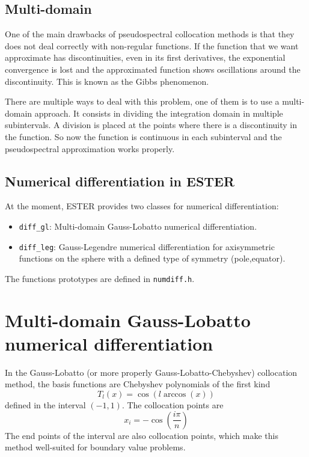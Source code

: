 \subsection{Multi-domain}

One of the main drawbacks of pseudospectral collocation methods is that they does not deal correctly
with non-regular functions. If the function that we want approximate has discontinuities, even in its
first derivatives, the exponential convergence is lost and the approximated function shows oscillations
around the discontinuity. This is known as the Gibbs phenomenon. 

There are multiple ways to deal with this problem, one of them is to use a multi-domain approach. 
It consists in dividing the integration domain in multiple subintervals. A division is placed at
the points where there is a discontinuity in the function. So now the function is continuous
in each subinterval and the pseudospectral approximation works properly.

\subsection{Numerical differentiation in ESTER}

At the moment, ESTER provides two classes for numerical differentiation:
\begin{itemize}
\item {\tt diff\_gl}: Multi-domain Gauss-Lobatto numerical differentiation.
\item {\tt diff\_leg}: Gauss-Legendre numerical differentiation for axisymmetric functions on the sphere 
with a defined type of symmetry (pole,equator). 
\end{itemize}
The functions prototypes are defined in {\tt numdiff.h}.

\section{Multi-domain Gauss-Lobatto numerical differentiation}

In the Gauss-Lobatto (or more properly Gauss-Lobatto-Chebyshev) collocation method, the basis functions
are Chebyshev polynomials of the first kind
$$T_l(x)=\cos(l\arccos(x))$$
defined in the interval $(-1,1)$. The collocation points are
$$x_i=-\cos(\frac{i\pi}{n})$$
The end points of the interval are also collocation points, which make this method
well-suited for boundary value problems.

